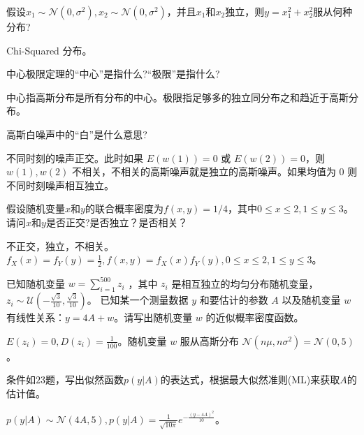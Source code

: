 \begin{problem}
	假设$x_1\sim \mathcal{N}(0,\sigma^2),x_2\sim\mathcal{N}(0,\sigma^2)$，并且$x_1$和$x_2$独立，则$y=x_1^2+x_2^2$服从何种分布?
\end{problem}
\begin{solution}
	Chi-Squared 分布。
\end{solution}


\begin{problem}
	中心极限定理的“中心”是指什么?“极限”是指什么?
\end{problem}
\begin{solution}
	中心指高斯分布是所有分布的中心。极限指足够多的独立同分布之和趋近于高斯分布。
\end{solution}


\begin{problem}
	高斯白噪声中的“白”是什么意思?
\end{problem}
\begin{solution}
	不同时刻的噪声正交。此时如果 $E(w(1)) = 0$ 或 $E(w(2)) = 0$，则 $w(1),w(2)$ 不相关，不相关的高斯噪声就是独立的高斯噪声。如果均值为 0 则不同时刻噪声相互独立。
\end{solution}


\begin{problem}
	假设随机变量$x$和$y$的联合概率密度为$f(x,y)=1/4$，其中$0\le x\le 2,1\le y\le 3$。请问$x$和$y$是否正交?是否独立？是否相关？
\end{problem}
\begin{solution}
	不正交，独立，不相关。$f_X(x) = f_Y(y) = \frac{1}{2},f(x, y) = f_X(x)f_Y(y),0 \le x \le 2, 1 \le y \le 3$。
\end{solution}


\begin{problem}
	已知随机变量 $w=\sum_{i=1}^{500}z_i$ ，其中 $z_i$ 是相互独立的均匀分布随机变量，$z_i\sim\mathcal{U}(-\frac{\sqrt{3}}{10},\frac{\sqrt{3}}{10})$。 已知某一个测量数据 $y$ 和要估计的参数 $A$ 以及随机变量 $w$ 有线性关系：$y=4A+w$。请写出随机变量 $w$ 的近似概率密度函数。
\end{problem}
\begin{solution}
	$E(z_i) = 0, D(z_i) = \frac{1}{100}$。随机变量 $w$ 服从高斯分布 $\mathcal{N}(n\mu, n\sigma^2) = \mathcal{N}(0, 5)$。
\end{solution}


\begin{problem}
	条件如$23$题，写出似然函数$p(y|A)$的表达式，根据最大似然准则(ML)来获取$A$的估计值。
\end{problem}
\begin{solution}
	$p(y|A) \sim \mathcal{N}(4A, 5), p(y|A) = \frac{1}{\sqrt{10\pi}}e^{-\frac{(y - 4A)^2}{10}}$。


\end{solution}


